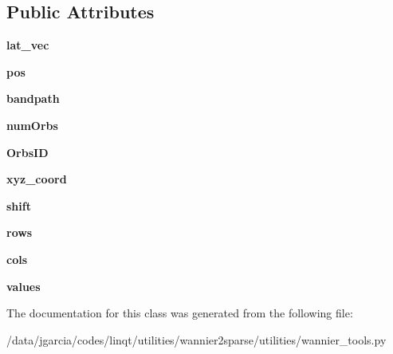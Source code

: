 \subsection*{Public Attributes}
\begin{DoxyCompactItemize}
\item 
{\bfseries lat\+\_\+vec}\hypertarget{classwannier__tools_1_1wannier__system_a8d5d25e1d7ab2607c3b99181d2b9bd91}{}\label{classwannier__tools_1_1wannier__system_a8d5d25e1d7ab2607c3b99181d2b9bd91}

\item 
{\bfseries pos}\hypertarget{classwannier__tools_1_1wannier__system_a32b397c0d29be1f1a1fee5cf96406eb8}{}\label{classwannier__tools_1_1wannier__system_a32b397c0d29be1f1a1fee5cf96406eb8}

\item 
{\bfseries bandpath}\hypertarget{classwannier__tools_1_1wannier__system_af0dd7f7e27c7132ca681427b84765ca7}{}\label{classwannier__tools_1_1wannier__system_af0dd7f7e27c7132ca681427b84765ca7}

\item 
{\bfseries num\+Orbs}\hypertarget{classwannier__tools_1_1wannier__system_a31f335897cd9a8ddfa9982457fe64aa0}{}\label{classwannier__tools_1_1wannier__system_a31f335897cd9a8ddfa9982457fe64aa0}

\item 
{\bfseries Orbs\+ID}\hypertarget{classwannier__tools_1_1wannier__system_acfaebcaf2a60b0079edfc2d6853cf31e}{}\label{classwannier__tools_1_1wannier__system_acfaebcaf2a60b0079edfc2d6853cf31e}

\item 
{\bfseries xyz\+\_\+coord}\hypertarget{classwannier__tools_1_1wannier__system_a59c448e26248974a57c08102d5d328e4}{}\label{classwannier__tools_1_1wannier__system_a59c448e26248974a57c08102d5d328e4}

\item 
{\bfseries shift}\hypertarget{classwannier__tools_1_1wannier__system_a7f7d15034dfb0410884928a45e0df26f}{}\label{classwannier__tools_1_1wannier__system_a7f7d15034dfb0410884928a45e0df26f}

\item 
{\bfseries rows}\hypertarget{classwannier__tools_1_1wannier__system_a2a30bedc47c7f97679357503cf2bfcae}{}\label{classwannier__tools_1_1wannier__system_a2a30bedc47c7f97679357503cf2bfcae}

\item 
{\bfseries cols}\hypertarget{classwannier__tools_1_1wannier__system_adc029b27f4a2434e66829783025c02c6}{}\label{classwannier__tools_1_1wannier__system_adc029b27f4a2434e66829783025c02c6}

\item 
{\bfseries values}\hypertarget{classwannier__tools_1_1wannier__system_a6ad540171bbbee9a60571072da2d2f6f}{}\label{classwannier__tools_1_1wannier__system_a6ad540171bbbee9a60571072da2d2f6f}

\end{DoxyCompactItemize}


The documentation for this class was generated from the following file\+:\begin{DoxyCompactItemize}
\item 
/data/jgarcia/codes/linqt/utilities/wannier2sparse/utilities/wannier\+\_\+tools.\+py\end{DoxyCompactItemize}
